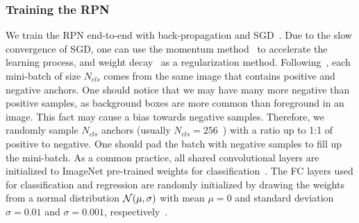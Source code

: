 \subsubsection{Training the RPN}
%
We train the RPN end-to-end with back-propagation and SGD~\cite{LeCun1989}.
Due to the slow convergence of SGD, one can use the momentum method~\cite{Qian1999} to accelerate the learning process, and weight decay~\cite{goodfellow2016} as a regularization method.
Following~\cite{Girshick2015}, each mini-batch of size $N_{cls}$ comes from the same image that contains positive and negative anchors.
One should notice that we may have many more negative than positive samples, as background boxes are more common than foreground in an image.
This fact may cause a bias towards negative samples.
Therefore, we randomly sample $N_{cls}$ anchors (usually $N_{cls}=256$~\cite{Ren2017fasterpami}) with a ratio up to 1:1 of positive to negative.
One should pad the batch with negative samples to fill up the mini-batch.
As a common practice, all shared convolutional layers are initialized to ImageNet pre-trained weights for classification~\cite{Russakovsky2015, Krizhevsky2012}.
The FC layers used for classification and regression are randomly initialized by drawing the weights from a normal distribution $\mathcal{N}(\mu, \sigma)$ with mean $\mu=0$ and standard deviation $\sigma=0.01$ and $\sigma=0.001$, respectively~\cite{Ren2017fasterpami}.

